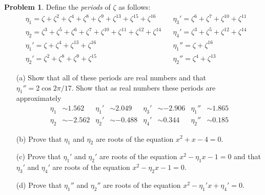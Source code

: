 \documentclass{article}
\theoremstyle{definition}
\newtheorem{prob}{Problem}
\begin{document}
\setcounter{prob}{13}
\begin{prob}
	Define the \textit{periods} of $\zeta$ as follows:
	\begin{align*}
		&\eta_1 = \zeta + \zeta^2 + \zeta^4 + \zeta^8 + \zeta^9 + \zeta^{13} + \zeta^{15} + \zeta^{16} & &\eta_3' = \zeta^6 + \zeta^7 + \zeta^{10} + \zeta^{11}\\
		&\eta_2 = \zeta^3 + \zeta^5 + \zeta^6 + \zeta^7 + \zeta^{10} + \zeta^{11} + \zeta^{12} + \zeta^{14} & &\eta_4' = \zeta^3 + \zeta^5 + \zeta^{12} + \zeta^{14}\\
		&\eta_1' = \zeta + \zeta^4 + \zeta^{13} + \zeta^{16} & &\eta_1'' = \zeta + \zeta^{16}\\
		&\eta_2' = \zeta^2 + \zeta^8 + \zeta^9 + \zeta^{15} & &\eta_2'' = \zeta^4 + \zeta^{13}
	\end{align*}

	\begin{enumerate}
		\item[(a)] Show that all of these periods are real numbers and that $\eta_1'' = 2 \cos 2 \pi/17$.
			Show that as real numbers these periods are approximately
			\begin{align*}
				\eta_1 &\sim 1.562 & \eta_1' &\sim 2.049 & \eta_3' &\sim -2.906 & \eta_1'' &\sim 1.865\\
				\eta_2 &\sim -2.562 & \eta_2' &\sim -0.488 & \eta_4' &\sim 0.344 & \eta_2'' &\sim 0.185
			\end{align*}

		\item[(b)] Prove that $\eta_1$ and $\eta_2$ are roots of the equation $x^2 + x - 4 = 0$.

		\item[(c)] Prove that $\eta_1'$ and $\eta_2'$ are roots of the equation $x^2 - \eta_1 x - 1 = 0$ and that $\eta_3'$ and $\eta_4'$ are roots of the equation $x^2 - \eta_2 x - 1 = 0$.

		\item[(d)] Prove that $\eta_1''$ and $\eta_2''$ are roots of the equation $x^2 - \eta_1' x + \eta_4' = 0$.
	\end{enumerate}
\end{prob}
\end{document}
